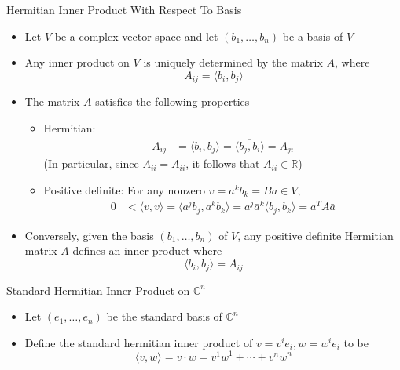 \documentclass[usenames,dvipsnames,10pt]{beamer}
\newcommand\C{\mathbb{C}}
\newcommand{\R}{\mathbb{R}}
\begin{document}
\begin{frame}
  {Hermitian Inner Product With Respect To Basis}

  \begin{itemize}
  \item Let $V$ be a complex vector space and let $(b_1, \dots, b_n)$ be a basis of $V$
  \item Any inner product on $V$ is uniquely determined by the matrix $A$, where
    \[
      A_{ij} = \langle b_i, b_j\rangle
    \]
  \item The matrix $A$ satisfies the following properties
    \begin{itemize}
    \item Hermitian:
      \begin{align*}
        A_{ij} &= \langle b_i, b_j\rangle
                 = \overline{\langle b_j, b_i\rangle}
                 = \bar{A}_{ji}
      \end{align*}
      (In particular, since $A_{ii} = \bar{A}_{ii}$, it follows that $A_{ii} \in \R$)
    \item Positive definite: For any nonzero $v = a^kb_k = Ba \in V$,
      \begin{align*}
        0 &< \langle v,v\rangle
            = \langle a^jb_j,a^kb_k\rangle
            = a^j\bar{a}^k\langle b_j,b_k\rangle
            = a^TA\bar{a}
      \end{align*}
    \end{itemize}
  \item Conversely, given the basis $(b_1, \dots, b_n)$ of $V$, any positive definite Hermitian matrix $A$ defines an inner product where
    \[
      \langle b_i,b_j\rangle = A_{ij}
    \]
  \end{itemize}
\end{frame}

\begin{frame}
  {Standard Hermitian Inner Product on $\C^n$}

  \begin{itemize}
  \item Let $(e_1, \dots, e_n)$ be the standard basis of $\C^n$
  \item Define the standard hermitian inner product of $v = v^ie_i, w = w^ie_i$ to be
    \[
      \langle v, w \rangle = v\cdot \bar{w} = v^1\bar{w}^1 + \cdots + v^n\bar{w}^n
    \]
  \end{itemize}
\end{frame}
\end{document}
